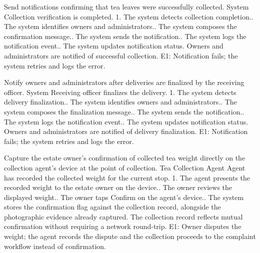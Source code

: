 {Send notifications confirming that tea leaves were successfully collected.}
{System}
{Collection verification is completed.}
{1. The system detects collection completion.. The system identifies owners and administrators.. The system composes the confirmation message.. The system sends the notification.. The system logs the notification event.. The system updates notification status.}
{Owners and administrators are notified of successful collection.}
{E1: Notification fails; the system retries and logs the error.}

{Notify owners and administrators after deliveries are finalized by the receiving officer.}
{System}
{Receiving officer finalizes the delivery.}
{1. The system detects delivery finalization.. The system identifies owners and administrators.. The system composes the finalization message.. The system sends the notification.. The system logs the notification event.. The system updates notification status.}
{Owners and administrators are notified of delivery finalization.}
{E1: Notification fails; the system retries and logs the error.}

{Capture the estate owner's confirmation of collected tea weight directly on the collection agent's device at the point of collection. }
{Tea Collection Agent}
{Agent has recorded the collected weight for the current stop. }
{1. The agent presents the recorded weight to the estate owner on the device.. The owner reviews the displayed weight.. The owner taps Confirm on the agent's device.. The system stores the confirmation flag against the collection record, alongside the photographic evidence already captured.\newline
}
{The collection record reflects mutual confirmation without requiring a network round-trip. }
{E1: Owner disputes the weight; the agent records the dispute and the collection proceeds to the complaint workflow instead of confirmation. }


